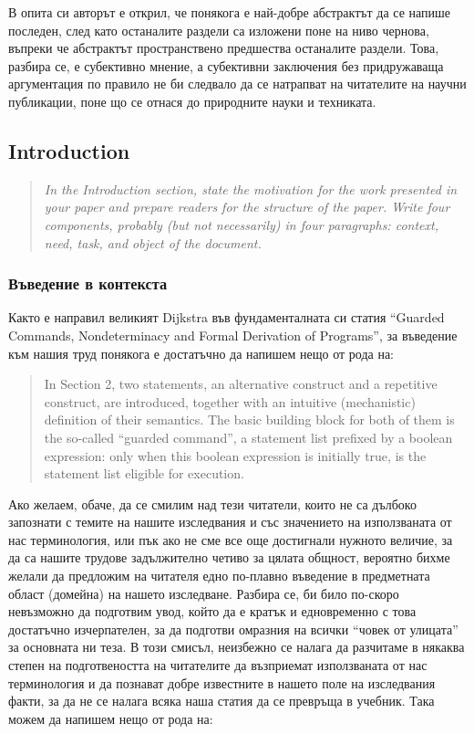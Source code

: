 \documentclass[11pt, oneside]{article}     %
\newenvironment{quotenature}{\begin{quote}\itshape}{\cite{nature}\end{quote}}
\begin{document}
В опита си авторът е открил, че понякога е най-добре абстрактът да се напише последен, след като останалите раздели са изложени поне на ниво чернова, въпреки че абстрактът пространствено предшества останалите раздели. Това, разбира се, е субективно мнение, а субективни заключения без придружаваща аргументация по правило не би следвало да се натрапват на читателите на научни публикации, поне що се отнася до природните науки и техниката.

\subsection*{Introduction}

\begin{quotenature}
  In the Introduction section, state the motivation for the work presented in your paper and prepare readers for the structure of the paper. Write four components, probably (but not necessarily) in four paragraphs: context, need, task, and object of the document.
\end{quotenature}

\subsubsection*{Въведение в контекста}

Както е направил великият Dijkstra във фундаменталната си статия ``Guarded Commands, Nondeterminacy and Formal Derivation of Programs'', за въведение към нашия труд понякога е достатъчно да напишем нещо от рода на:
\begin{quote}
  In Section 2, two statements, an alternative construct and a repetitive construct, are introduced, together with an intuitive (mechanistic) definition of their semantics. The basic building block for both of them is the so-called ``guarded command'', a statement list prefixed by a boolean expression: only when this boolean expression is initially true, is the statement list eligible for execution. \cite{dijderive}
\end{quote}

Ако желаем, обаче, да се смилим над тези читатели, които не са дълбоко запознати с темите на нашите изследвания и със значението на използваната от нас терминология, или пък ако не сме все още достигнали нужното величие, за да са нашите трудове задължително четиво за цялата общност, вероятно бихме желали да предложим на читателя едно по-плавно въведение в предметната област (домейна) на нашето изследване. Разбира се, би било по-скоро невъзможно да подготвим увод, който да е кратък и едновременно с това достатъчно изчерпателен, за да подготви омразния на всички ``човек от улицата'' за основната ни теза. В този смисъл, неизбежно се налага да разчитаме в някаква степен на подготвеността на читателите да възприемат използваната от нас терминология и да познават добре известните в нашето поле на изследвания факти, за да не се налага всяка наша статия да се превръща в учебник. Така можем да напишем нещо от рода на:
\end{document}
